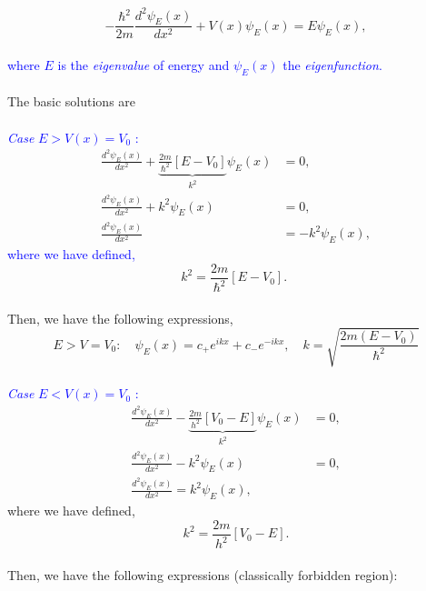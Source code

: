 \documentclass{article}
\begin{document}
\begin{equation}
    -\frac{\hbar^{2}}{2 m} \frac{d^{2} \psi_{E}(x)}{d x^{2}}+V(x) \psi_{E}(x)=E \psi_{E}(x),
\end{equation}
\\
\textcolor{blue}{where $E$ is the \textit{eigenvalue} of energy and $\psi_{E}(x)$ the \textit{eigenfunction}.}
\\
\\
The basic solutions are
\\
\\
\textcolor{blue}{\textit{Case} $E>V(x)=V_{0}$ :}
\begin{equation}
\begin{aligned}
\frac{d^{2} \psi_E(x)}{d x^{2}}+\underbrace{\frac{2 m}{\hbar^{2}}[E-V_0]}_{k^{2}} \psi_E(x) &=0, \\
\frac{d^{2} \psi_E(x)}{d x^{2}}+k^{2} \psi_E(x) &=0, \\
\frac{d^{2} \psi_E(x)}{d x^{2}} &=-k^{2} \psi_E(x),
\end{aligned}
\end{equation}
\textcolor{blue}{where we have defined,}
\begin{equation}
k^{2}=\frac{2 m}{\hbar^{2}}[E-V_0] \text {. }
\end{equation}
\\
Then, we have the following expressions,
\begin{equation}
E>V=V_{0}: \quad \psi_{E}(x)=c_{+} e^{i k x}+c_{-} e^{-i k x}, \quad k=\sqrt{\frac{2 m\left(E-V_{0}\right)}{\hbar^{2}}}
\end{equation}
\\
\textcolor{blue}{\textit{Case} $E<V(x)=V_{0}$ :}
\begin{equation}
\begin{aligned}
\frac{d^{2} \psi_{E}(x)}{d x^{2}}-\underbrace{\frac{2 m}{h^{2}}\left[V_{0}-E\right]}_{k^{2}} \psi_{E}(x) &=0, \\
\frac{d^{2} \psi_{E}(x)}{d x^{2}}-k^{2} \psi_{E}(x) &=0, \\
\frac{d^{2} \psi_{E}(x)}{d x^{2}}=k^{2} \psi_{E}(x),
\end{aligned}
\end{equation}
where we have defined,
\begin{equation}
k^{2}=\frac{2 m}{h^{2}}\left[V_{0}-E\right].
\end{equation}
\\
Then, we have the following expressions (classically forbidden region):
\end{document}
